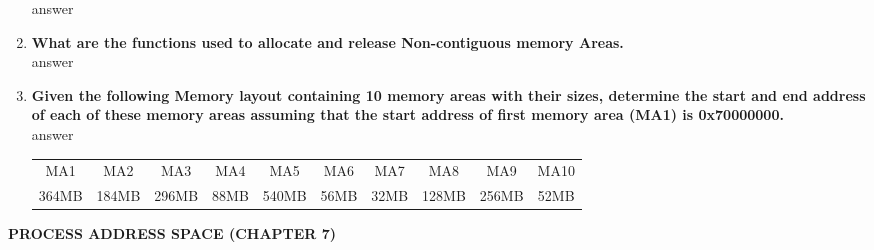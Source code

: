 \documentclass[a4paper,12pt]{article}
\begin{document}
\begin{flushleft}
\begin{enumerate}
{\color{red}answer}\\
\item \textbf{  What are the functions used to allocate and release Non-contiguous memory Areas.}\\
{\color{red}answer}\\
\item \textbf{ Given the following Memory layout containing 10 memory areas with their sizes, determine the start and end address of each of these memory areas assuming that the start address of first memory area (MA1) is 0x70000000.}\\
{\color{red}answer}\\

\begin{tabular}{c c c c c c c c c c}
\\MA1&MA2&MA3&MA4&MA5&MA6&MA7&MA8&MA9&MA10\\
364MB&184MB&296MB&88MB&540MB&56MB&32MB&128MB&256MB&52MB\\
\end{tabular}
\end{enumerate}

\textbf{  PROCESS ADDRESS SPACE (CHAPTER 7)\\}
\begin{enumerate}


\end{enumerate}
\end{flushleft}
\end{document}
